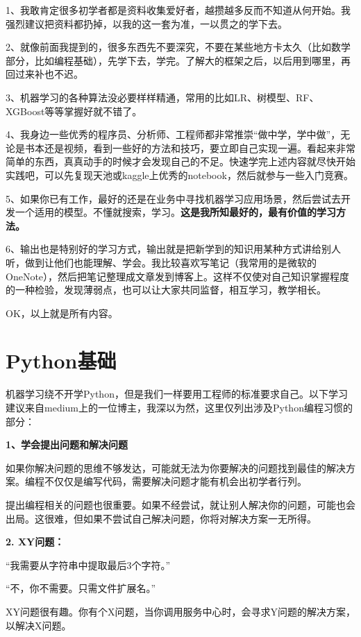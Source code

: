 \documentclass[]{ctexbook}
\begin{document}
1、我敢肯定很多初学者都是资料收集爱好者，越攒越多反而不知道从何开始。我强烈建议把资料都扔掉，以我的这一套为准，一以贯之的学下去。

2、就像前面我提到的，很多东西先不要深究，不要在某些地方卡太久（比如数学部分，比如编程基础），先学下去，学完。了解大的框架之后，以后用到哪里，再回过来补也不迟。

3、机器学习的各种算法没必要样样精通，常用的比如LR、树模型、RF、XGBoost等等掌握好就不错了。

4、我身边一些优秀的程序员、分析师、工程师都非常推崇``做中学，学中做''，无论是书本还是视频，看到一些好的方法和技巧，要立即自己实现一遍。看起来非常简单的东西，真真动手的时候才会发现自己的不足。快速学完上述内容就尽快开始实践吧，可以先复现天池或kaggle上优秀的notebook，然后就参与一些入门竞赛。

5、如果你已有工作，最好的还是在业务中寻找机器学习应用场景，然后尝试去开发一个适用的模型。不懂就搜索，学习。\textbf{这是我所知最好的，最有价值的学习方法。}

6、输出也是特别好的学习方式，输出就是把新学到的知识用某种方式讲给别人听，做到让他们也能理解、学会。我比较喜欢写笔记（我常用的是微软的OneNote），然后把笔记整理成文章发到博客上。这样不仅使对自己知识掌握程度的一种检验，发现薄弱点，也可以让大家共同监督，相互学习，教学相长。

OK，以上就是所有内容。

\hypertarget{pythonux57faux7840}{%
\chapter{Python基础}\label{pythonux57faux7840}}

机器学习绕不开学Python，但是我们一样要用工程师的标准要求自己。以下学习建议来自medium上的一位博主，我深以为然，这里仅列出涉及Python编程习惯的部分：

\textbf{1、学会提出问题和解决问题}

如果你解决问题的思维不够发达，可能就无法为你要解决的问题找到最佳的解决方案。编程不仅仅是编写代码，需要解决问题才能有机会出初学者行列。

提出编程相关的问题也很重要。如果不经尝试，就让别人解决你的问题，可能也会出局。这很难，但如果不尝试自己解决问题，你将对解决方案一无所得。

\textbf{2. XY问题：}

``我需要从字符串中提取最后3个字符。''

``不，你不需要。只需文件扩展名。''

XY问题很有趣。你有个X问题，当你调用服务中心时，会寻求Y问题的解决方案，以解决X问题。
\end{document}
